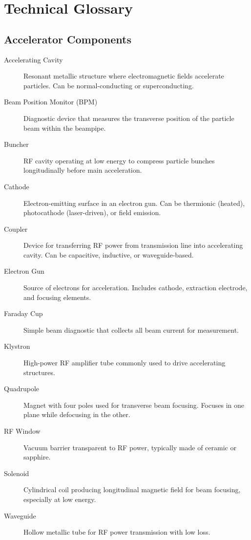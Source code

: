 
\section{Technical Glossary}

\subsection{Accelerator Components}

\begin{description}
\item[Accelerating Cavity] Resonant metallic structure where electromagnetic fields accelerate particles. Can be normal-conducting or superconducting.

\item[Beam Position Monitor (BPM)] Diagnostic device that measures the transverse position of the particle beam within the beampipe.

\item[Buncher] RF cavity operating at low energy to compress particle bunches longitudinally before main acceleration.

\item[Cathode] Electron-emitting surface in an electron gun. Can be thermionic (heated), photocathode (laser-driven), or field emission.

\item[Coupler] Device for transferring RF power from transmission line into accelerating cavity. Can be capacitive, inductive, or waveguide-based.

\item[Electron Gun] Source of electrons for acceleration. Includes cathode, extraction electrode, and focusing elements.

\item[Faraday Cup] Simple beam diagnostic that collects all beam current for measurement.

\item[Klystron] High-power RF amplifier tube commonly used to drive accelerating structures.

\item[Quadrupole] Magnet with four poles used for transverse beam focusing. Focuses in one plane while defocusing in the other.

\item[RF Window] Vacuum barrier transparent to RF power, typically made of ceramic or sapphire.

\item[Solenoid] Cylindrical coil producing longitudinal magnetic field for beam focusing, especially at low energy.

\item[Waveguide] Hollow metallic tube for RF power transmission with low loss.
\end{description}

